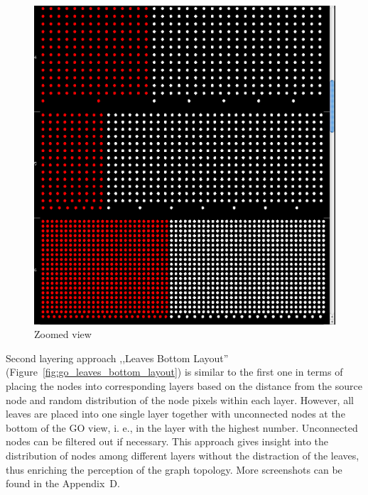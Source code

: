 \begin{figure}[h!]
\centering
\includegraphics[scale=0.3]{pictures/go_levels_layout_zoomed.png}
\caption{Zoomed view}
\label{fig:go_levels_layout_zoomed}
\end{figure}

Second layering approach ,,Leaves Bottom Layout'' (Figure~\ref{fig:go_leaves_bottom_layout}) is similar to the first one in terms of placing the nodes into corresponding layers based on the distance from the source node and random distribution of the node pixels within each layer. However, all leaves are placed into one single layer together with unconnected nodes at the bottom of the GO view, i. e., in the layer with the highest number. Unconnected nodes can be filtered out if necessary. This approach gives insight into the distribution of nodes among different layers without the distraction of the leaves, thus enriching the perception of the graph topology. More screenshots can be found in the Appendix~D.


